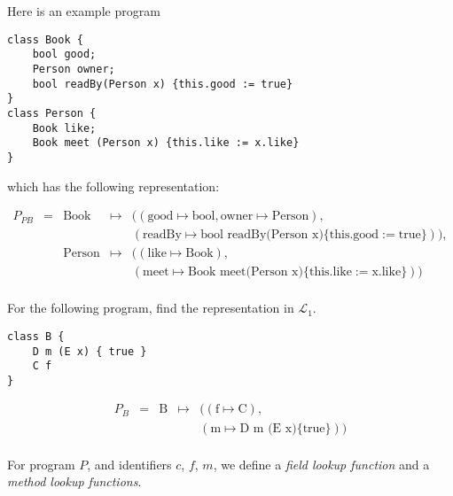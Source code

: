 \begin{example}
Here is an example program
\begin{lstlisting}
class Book {
	bool good;
	Person owner;
	bool readBy(Person x) {this.good := true}
}
class Person {
	Book like;
	Book meet (Person x) {this.like := x.like}
}
\end{lstlisting}

which has the following representation:


\[ \begin{array}{lllll}
P_{PB} & = & \text{Book}   & \mapsto & ((\text{good} \mapsto \text{bool}, 
                                   \text{owner} \mapsto \text{Person}), \\
       &   &               &         &  (\text{readBy} \mapsto \text{bool readBy(Person x)}
                                    \{ \text{this.good} := \text{true} \})), \\
       &   & \text{Person} & \mapsto & ((\text{like} \mapsto \text{Book}), \\
       &   &               &         &  (\text{meet} \mapsto \text{Book meet(Person x)}
                                    \{ \text{this.like} := \text{x.like} \}))	 \\
\end{array}\] 


\end{example}



\begin{example}
For the following program, find the representation in $\mathcal{L}_1$.

\begin{lstlisting}
class B {
	D m (E x) { true }
	C f
}
\end{lstlisting}
\end{example}

\frmrule

\[ \begin{array}{lllll}
P_B & = & \text{B}   & \mapsto & ((\text{f} \mapsto \text{C}), \\ 
    &   &            &         &  (\text{m} \mapsto \text{D m (E x)}
                                    \{ \text{true} \})) \\
\end{array}\] 

\frmrule

For program $P$, and identiﬁers $c$, $f$, $m$, we define 
a \textit{field lookup function} and a \textit{method lookup functions}.

